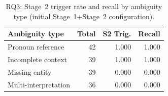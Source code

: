 ﻿\documentclass[11pt,twocolumn]{article}
\begin{document}
\begin{table}[!htbp]
\centering
\caption{RQ3: Clarification on the $234$-query ambiguity benchmark.}
\label{tab:ambiguity}
\scriptsize
\setlength{\tabcolsep}{2.5pt}
\end{table}

\begin{table}[!htbp]
\centering
\caption{RQ3: Stage~2 trigger rate and recall by ambiguity type
(initial Stage~1+Stage~2 configuration).}
\label{tab:ambiguity_type}
\small
\setlength{\tabcolsep}{3.0pt}
\begin{tabular}{lrrr}
\toprule
\textbf{Ambiguity type} & \textbf{Total} & \textbf{S2 Trig.} & \textbf{Recall} \\
\midrule
Pronoun reference & 42 & 1.000 & 1.000 \\
Incomplete context & 39 & 1.000 & 1.000 \\
Missing entity & 39 & 0.000 & 0.000 \\
Multi-interpretation & 36 & 0.000 & 0.000 \\
\bottomrule
\end{tabular}
\end{table}
\end{document}
